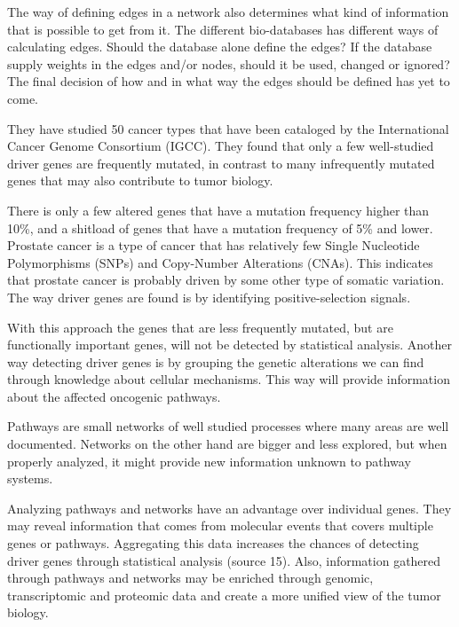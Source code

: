 \documentclass[UKenglish]{ifimaster}
\begin{document}
The way of defining edges in a network also determines what kind of information
that is possible to get from it. The different bio-databases has different ways
of calculating edges. Should the database alone define the edges? If the
database supply weights in the edges and/or nodes, should it be used, changed or
ignored? The final decision of how and in what way the edges should be defined
has yet to come. 

They have studied 50 cancer types that have been cataloged by the International
Cancer Genome Consortium (IGCC). They found that only a few well-studied driver
genes are frequently mutated, in contrast to many infrequently mutated genes
that may also contribute to tumor biology.

There is only a few altered genes that have a mutation frequency higher than
10\%, and a shitload of genes that have a mutation frequency of 5\% and lower.
Prostate cancer is a type of cancer that has relatively few Single Nucleotide
Polymorphisms (SNPs) and Copy-Number Alterations (CNAs). This indicates that
prostate cancer is probably driven by some other type of somatic variation. The
way driver genes are found is by identifying positive-selection signals.



With this approach the genes that are less frequently mutated, but are
functionally important genes, will not be detected by statistical analysis.
Another way detecting driver genes is by grouping the genetic alterations we can
find through knowledge about cellular mechanisms. This way will provide
information about the affected oncogenic pathways.

Pathways are small networks of well studied processes where many areas are well
documented. Networks on the other hand are bigger and less explored, but when
properly analyzed, it might provide new information unknown to pathway systems.

Analyzing pathways and networks have an advantage over individual genes. They
may reveal information that comes from molecular events that covers multiple
genes or pathways. Aggregating this data increases the chances of detecting
driver genes through statistical analysis (source 15). Also, information
gathered through pathways and networks may be enriched through genomic,
transcriptomic and proteomic data and create a more unified view of the tumor
biology.
\end{document}
